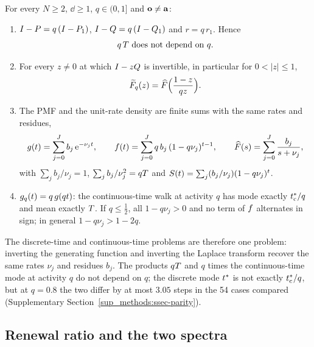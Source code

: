 \begin{proposition}\label{s2_model:prop-structure}
For every $N\ge2$, $\dd\ge1$, $q\in(0,1]$ and $\mathbf{o}\neq\mathbf{a}$:
\begin{enumerate}
\item[(a)] $I-P=q\,(I-P_1)$, $I-Q=q\,(I-Q_1)$ and $r=q\,r_1$. Hence
\begin{equation}\label{s2_model:eq-qscaling}
  q\,T\ \text{does not depend on } q .
\end{equation}
\item[(b)] For every $z\neq0$ at which $I-zQ$ is invertible, in particular for $0<|z|\le1$,
\begin{equation}\label{s2_model:eq-transform}
  \widetilde{F}_q(z)=\widehat{F}\Bigl(\frac{1-z}{qz}\Bigr).
\end{equation}
\item[(c)] The PMF and the unit-rate density are finite sums with the same rates and residues,
\begin{equation}\label{s2_model:eq-spectral}
  g(t)=\sum_{j=0}^{J}b_j\,\mathrm{e}^{-\nu_j t},\qquad
  f(t)=\sum_{j=0}^{J}q\,b_j\,(1-q\nu_j)^{t-1},\qquad
  \widehat{F}(s)=\sum_{j=0}^{J}\frac{b_j}{s+\nu_j},
\end{equation}
with $\sum_j b_j/\nu_j=1$, $\sum_j b_j/\nu_j^{2}=qT$ and $S(t)=\sum_j(b_j/\nu_j)(1-q\nu_j)^{t}$.
\item[(d)] $g_q(t)=q\,g(qt)$: the continuous-time walk at activity $q$ has mode exactly $t^{*}_{\mathrm{c}}/q$ and mean
exactly $T$. If $q\le\tfrac12$, all $1-q\nu_j>0$ and no term of $f$ alternates in sign; in general
$1-q\nu_j>1-2q$.
\end{enumerate}
\end{proposition}

The discrete-time and continuous-time problems are therefore one problem: inverting the generating function and
inverting the Laplace transform recover the same rates $\nu_j$ and residues $b_j$. The products $qT$ and $q$ times
the continuous-time mode at activity $q$ do not depend on $q$; the discrete mode $t^{*}$ is not exactly
$t^{*}_{\mathrm{c}}/q$, but at $q=0.8$ the two differ by at most $3.05$ steps in the 54 cases compared
(Supplementary Section~\ref{sup_methods:ssec-parity}).

\subsection{Renewal ratio and the two spectra}\label{s2_model:ssec-spectra}

